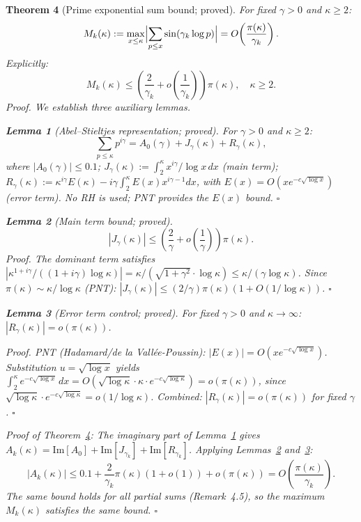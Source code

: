 \documentclass[11pt]{article}
\newtheorem{theorem}{Theorem}[section]
\newtheorem{lemma}[theorem]{Lemma}
\begin{document}
\begin{theorem}[Prime exponential sum bound; proved]\label{thm:EXPLICIT}
For fixed $\gamma > 0$ and $\kappa\geq 2$:
\[
M_k(\kappa) := \max_{x\leq\kappa}\Bigl|\sum_{p\leq x}\sin(\gamma_k\log p)\Bigr|
= O\!\left(\frac{\pi(\kappa)}{\gamma_k}\right).
\]
Explicitly:
\[
M_k(\kappa) \leq \left(\frac{2}{\gamma_k} + o\!\left(\frac{1}{\gamma_k}\right)\right)\pi(\kappa),
\quad\kappa\geq 2.
\]
\emph{Proof.}
We establish three auxiliary lemmas.

\begin{lemma}[Abel--Stieltjes representation; proved]\label{lem:T1}
For $\gamma > 0$ and $\kappa\geq 2$:
\[
\sum_{p\leq\kappa}p^{i\gamma}
= A_0(\gamma) + J_\gamma(\kappa) + R_\gamma(\kappa),
\]
where $|A_0(\gamma)|\leq 0.1$;
$J_\gamma(\kappa) := \int_2^\kappa x^{i\gamma}/\log x\,dx$ (main term);
$R_\gamma(\kappa) := \kappa^{i\gamma}E(\kappa)
- i\gamma\int_2^\kappa E(x)x^{i\gamma-1}dx$,
with $E(x) = O(xe^{-c\sqrt{\log x}})$ (error term).
No RH is used; PNT provides the $E(x)$ bound. $\square$
\end{lemma}

\begin{lemma}[Main term bound; proved]\label{lem:T2}
\[
|J_\gamma(\kappa)| \leq
\left(\frac{2}{\gamma} + o\!\left(\frac{1}{\gamma}\right)\right)\pi(\kappa).
\]
\emph{Proof.}
The dominant term satisfies
$|\kappa^{1+i\gamma}/((1+i\gamma)\log\kappa)|
= \kappa/(\sqrt{1+\gamma^2}\cdot\log\kappa) \leq \kappa/(\gamma\log\kappa)$.
Since $\pi(\kappa)\sim\kappa/\log\kappa$ (PNT):
$|J_\gamma(\kappa)|\leq(2/\gamma)\pi(\kappa)(1+O(1/\log\kappa))$. $\square$
\end{lemma}

\begin{lemma}[Error term control; proved]\label{lem:T3}
For fixed $\gamma > 0$ and $\kappa\to\infty$:
$|R_\gamma(\kappa)| = o(\pi(\kappa))$.

\emph{Proof.}
PNT (Hadamard/de la Vall\'ee-Poussin):
$|E(x)| = O(xe^{-c\sqrt{\log x}})$.
Substitution $u = \sqrt{\log x}$ yields
$\int_2^\kappa e^{-c\sqrt{\log x}}\,dx
= O(\sqrt{\log\kappa}\cdot\kappa\cdot e^{-c\sqrt{\log\kappa}})
= o(\pi(\kappa))$,
since $\sqrt{\log\kappa}\cdot e^{-c\sqrt{\log\kappa}} = o(1/\log\kappa)$.
Combined: $|R_\gamma(\kappa)| = o(\pi(\kappa))$ for fixed $\gamma$. $\square$
\end{lemma}

\emph{Proof of Theorem~\ref{thm:EXPLICIT}:}
The imaginary part of Lemma~\ref{lem:T1} gives
$A_k(\kappa) = \mathrm{Im}[A_0] + \mathrm{Im}[J_{\gamma_k}]
+ \mathrm{Im}[R_{\gamma_k}]$.
Applying Lemmas~\ref{lem:T2} and~\ref{lem:T3}:
\[
|A_k(\kappa)| \leq 0.1 + \frac{2}{\gamma_k}\pi(\kappa)(1+o(1)) + o(\pi(\kappa))
= O\!\left(\frac{\pi(\kappa)}{\gamma_k}\right).
\]
The same bound holds for all partial sums (Remark~4.5), so the maximum
$M_k(\kappa)$ satisfies the same bound. $\square$
\end{theorem}
\end{document}
